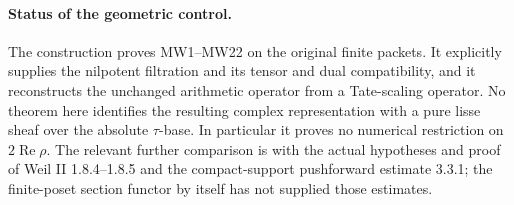 \paragraph{Status of the geometric control.}
The construction proves MW1--MW22 on the original finite packets.
It explicitly supplies the nilpotent filtration and its tensor
and dual compatibility, and it reconstructs the unchanged arithmetic
operator from a Tate-scaling operator. No theorem here identifies
the resulting complex representation with a pure lisse sheaf over
the absolute \(\tau\)-base. In particular it proves no numerical
restriction on \(2\operatorname{Re}\rho\). The relevant further
comparison is with the actual hypotheses and proof of Weil II
1.8.4--1.8.5 and the compact-support pushforward estimate 3.3.1;
the finite-poset section functor by itself has not supplied those
estimates.
